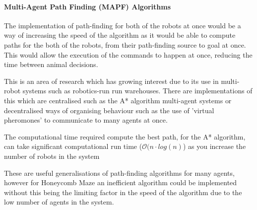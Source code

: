     
        
    




\paragraph{Multi-Agent Path Finding (MAPF) Algorithms } 

The implementation of path-finding for both of the robots at once would be a way of increasing the speed of the algorithm as it would be able to compute paths for the both of the robots, from their path-finding source to goal at once. This would allow the execution of the commands to happen at once, reducing the time between animal decisions.

This is an area of research which has growing interest due to its use in multi-robot systems such as robotics-run run warehouses. There are implementations of this which are centralised such as the A* algorithm multi-agent systems \cite{DBLP:journals/corr/abs-2103-09979} or decentralised ways of organising behaviour such as the use of 'virtual pheromones' \cite{multi_agent_pathfinding_review} to communicate to many agents at once. 

The computational time required compute the best path, for the A* algorithm, can take significant computational run time ($\mathcal{O}(n \cdot log(n)$) as you increase the number of robots in the system

These are useful generalisations of path-finding algorithms for many agents, however for Honeycomb Maze an inefficient algorithm could be implemented without this being the limiting factor in the speed of the algorithm due to the low number of agents in the system.


